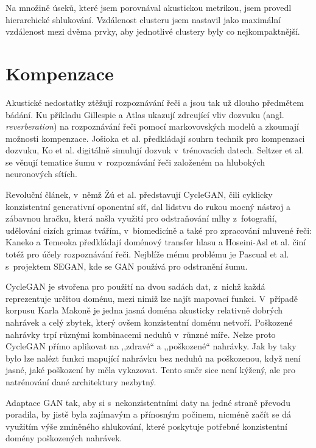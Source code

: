 Na množině úseků, které jsem porovnával akustickou metrikou, jsem provedl
hierarchické shlukování. Vzdálenost clusteru jsem nastavil jako maximální
vzdálenost mezi dvěma prvky, aby jednotlivé clustery byly co nejkompaktnější.

\section{Kompenzace}
\label{sec:akustika:kompenzace}

Akustické nedostatky ztěžují rozpoznávání řeči a jsou tak už dlouho předmětem
bádání. Ku příkladu Gillespie a Atlas\cite{gillespie2002diversity} ukazují
zdrcující vliv dozvuku (angl. {\em reverberation}) na rozpoznávání řeči pomocí
markovovských modelů a zkoumají možnosti kompenzace. Jošioka et
al.\cite{reverbmagazine} předkládají souhrn technik pro kompenzaci dozvuku, Ko
et al.\cite{reverbaugment} digitálně simulují dozvuk v~trénovacích datech.
Seltzer et al.\cite{dnnnoiserobust} se věnují tematice šumu v~rozpoznávání řeči
založeném na hlubokých neuronových sítích.

Revoluční článek\cite{cyclegan}, v~němž Žú et al. představují CycleGAN, čili
cyklicky konzistentní generativní oponentní síť, dal lidstvu do rukou mocný
nástroj a zábavnou hračku, která našla využití pro odstraňování mlhy
z~fotografií\cite{Engin_2018_CVPR_Workshops}, udělování cizích grimas
tvářím\cite{jin2017faceoff}, v~biomedicíně\cite{yang2018biogan} a také pro
zpracování mluvené řeči: Kaneko a Temeoka\cite{kaneko2017parallel} předkládají
doménový transfer hlasu a Hoseini-Asl et al.\cite{hosseini2018malevoicegan} činí
totéž pro účely rozpoznávání řeči. Nejblíže mému problému je Pascual et al.
s~projektem SEGAN\cite{pascual2017segan}, kde se GAN používá pro odstranění
šumu.

CycleGAN je stvořena pro použití na dvou sadách dat, z~nichž každá reprezentuje
určitou doménu, mezi nimiž lze najít mapovací funkci. V~případě korpusu Karla
Makoně je jedna jasná doména akusticky relativně dobrých nahrávek a celý zbytek,
který ovšem konzistentní doménu netvoří. Poškozené nahrávky trpí různými
kombinacemi neduhů v~růnzné míře. Nelze proto CycleGAN přímo aplikovat na
,,zdravé`` a ,,poškozené`` nahrávky. Jak by taky bylo lze nalézt funkci mapující
nahrávku bez neduhů na poškozenou, když není jasné, jaké poškození by měla
vykazovat. Tento směr sice není kýžený, ale pro natrénování dané architektury
nezbytný.

Adaptace GAN tak, aby si s~nekonzistentními daty na jedné straně převodu
poradila, by jistě byla zajímavým a přínosným počinem, nicméně začít se dá
využitím výše zmíněného shlukování, které poskytuje potřebné konzistentní
domény poškozených nahrávek.

